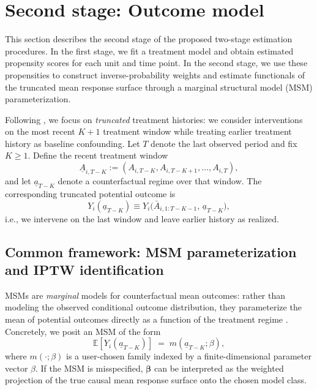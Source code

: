 \section{Second stage: Outcome model}
\label{sec:outcome-model}

This section describes the second stage of the proposed two-stage estimation 
procedures. In the first stage, we fit a treatment model and obtain estimated propensity 
scores for each unit and time point. In the second stage, 
we use these propensities to construct inverse-probability weights and 
estimate functionals of the truncated mean response surface through a 
marginal structural model (MSM) parameterization.

Following \cite{blackwellEffectPoliticalAdvertising2024}, we focus on 
\emph{truncated} treatment histories: we consider interventions on the 
most recent $K+1$ treatment window while treating earlier treatment history as 
baseline confounding. Let $T$ denote the last observed period and fix $K\ge 1$. Define the recent treatment window
\[
\underline{A}_{i,T-K} := (A_{i,T-K},A_{i,T-K+1},\dots,A_{i,T}),
\]
and let $\underline{a}_{T-K}$ denote a counterfactual regime over that window. The corresponding truncated potential outcome is
\[
Y_i(\underline{a}_{T-K}) \equiv Y_i\!\big(\bar{A}_{i,1:T-K-1},\,\underline{a}_{T-K}\big),
\]
i.e., we intervene on the last window and leave earlier history as realized.

\subsection{Common framework: MSM parameterization and IPTW identification}
MSMs are \emph{marginal} models for counterfactual mean outcomes: 
rather than modeling the observed conditional outcome distribution, 
they parameterize the mean of potential outcomes directly as a 
function of the treatment regime \cite{robinsMarginalStructuralModels2000}.
Concretely, we posit an MSM of the form
\begin{equation}
\label{eq:msm-generic}
\mathbb{E}\!\left[Y_i(\underline{a}_{T-K})\right] \;=\; m(\underline{a}_{T-K};\beta),
\end{equation}
where $m(\cdot;\beta)$ is a user-chosen family indexed by a finite-dimensional parameter vector $\beta$. 
If the MSM is misspecified, \(\boldsymbol{\beta}\) can be interpreted as the 
weighted projection of the true causal mean response surface onto the chosen model class.

